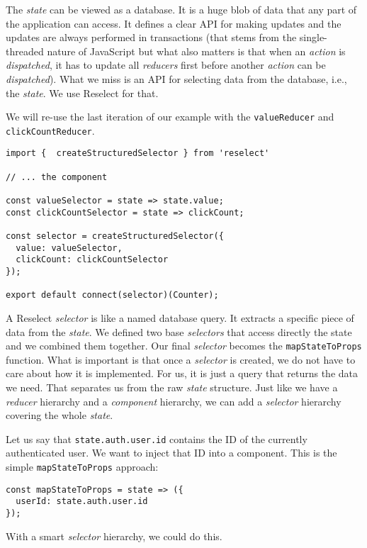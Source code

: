The \emph{state} can be viewed as a database. It is a huge blob of data that any part of the application can access. It defines a clear API for making updates and the updates are always performed in transactions (that stems from the single-threaded nature of JavaScript but what also matters is that when an \emph{action} is \emph{dispatched}, it has to update all \emph{reducers} first before another \emph{action} can be \emph{dispatched}). What we miss is an API for selecting data from the database, i.e., the \emph{state}. We use Reselect \cite{reselect} for that.

We will re-use the last iteration of our example with the \texttt{valueReducer} and \texttt{clickCountReducer}.

\begin{verbatim}
import {  createStructuredSelector } from 'reselect'

// ... the component

const valueSelector = state => state.value;
const clickCountSelector = state => clickCount;

const selector = createStructuredSelector({
  value: valueSelector,
  clickCount: clickCountSelector
});

export default connect(selector)(Counter);
\end{verbatim}

A Reselect \emph{selector} is like a named database query. It extracts a specific piece of data from the \emph{state}. We defined two base \emph{selectors} that access directly the state and we combined them together. Our final \emph{selector} becomes the \texttt{mapStateToProps} function. What is important is that once a \emph{selector} is created, we do not have to care about how it is implemented. For us, it is just a query that returns the data we need. That separates us from the raw \emph{state} structure. Just like we have a \emph{reducer} hierarchy and a \emph{component} hierarchy, we can add a \emph{selector} hierarchy covering the whole \emph{state}.

Let us say that \texttt{state.auth.user.id} contains the ID of the currently authenticated user. We want to inject that ID into a component. This is the simple \texttt{mapStateToProps} approach:

\begin{verbatim}
const mapStateToProps = state => ({
  userId: state.auth.user.id
});
\end{verbatim}

With a smart \emph{selector} hierarchy, we could do this.


